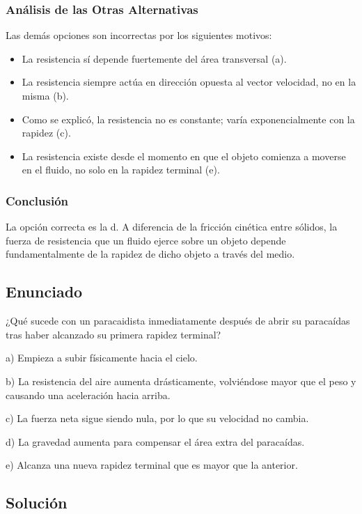 \documentclass[12pt]{article}
\begin{document}
\subsubsection*{Análisis de las Otras Alternativas}
Las demás opciones son incorrectas por los siguientes motivos:
\begin{itemize}
    \item La resistencia sí depende fuertemente del área transversal (a).
    \item La resistencia siempre actúa en dirección opuesta al vector velocidad, no en la misma (b).
    \item Como se explicó, la resistencia no es constante; varía exponencialmente con la rapidez (c).
    \item La resistencia existe desde el momento en que el objeto comienza a moverse en el fluido, no solo en la rapidez terminal (e).
\end{itemize}


\subsubsection*{Conclusión}
La opción correcta es la d. A diferencia de la fricción cinética entre sólidos, la fuerza de resistencia que un fluido ejerce sobre un objeto depende fundamentalmente de la rapidez de dicho objeto a través del medio.

\newpage

\subsection*{Enunciado}
¿Qué sucede con un paracaidista inmediatamente después de abrir su paracaídas tras haber alcanzado su primera rapidez terminal?

a) Empieza a subir físicamente hacia el cielo.

b) La resistencia del aire aumenta drásticamente, volviéndose mayor que el peso y causando una aceleración hacia arriba.

c) La fuerza neta sigue siendo nula, por lo que su velocidad no cambia.

d) La gravedad aumenta para compensar el área extra del paracaídas.

e) Alcanza una nueva rapidez terminal que es mayor que la anterior.

\subsection*{Solución}
\end{document}

